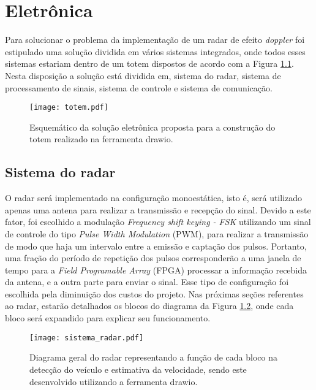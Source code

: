 
\chapter{Eletrônica}

Para solucionar o problema da implementação de um radar de efeito \emph{doppler}  foi estipulado uma solução dividida em vários sistemas integrados, onde todos esses sistemas estariam dentro de um totem dispostos de acordo com a Figura \ref{esquematico1}. Nesta disposição a solução está dividida em, sistema do radar,  sistema de processamento de sinais, sistema de controle e sistema de comunicação.
\begin{figure}[H]
    \centering
    \texttt{[image: totem.pdf]}
    \caption{Esquemático da solução eletrônica proposta para a construção do totem realizado na ferramenta drawio. }
    \label{esquematico1}
\end{figure}
\section{Sistema do radar}
O radar será implementado na configuração monoestática, isto é, será utilizado apenas uma  antena para realizar a transmissão e recepção do sinal. Devido a este fator, foi escolhido a modulação  \emph{ Frequency shift keying - FSK} utilizando um sinal de controle do tipo \emph{Pulse Width Modulation} (PWM), para realizar a transmissão de modo que haja um intervalo entre a emissão e captação dos pulsos. Portanto, uma fração do período de repetição dos pulsos corresponderão a uma janela de tempo para a \emph{Field Programable Array} (FPGA) processar a informação recebida da antena, e a outra parte para enviar o sinal. Esse tipo de configuração foi escolhida pela diminuição dos custos do projeto.
Nas próximas seções referentes ao radar, estarão detalhados os blocos do diagrama da Figura \ref{processos_geral_radar}, onde cada bloco será expandido para explicar seu funcionamento.
\begin{figure}[H]
    \centering
    \texttt{[image: sistema\_radar.pdf]}
    \caption{Diagrama geral do radar representando a função de cada bloco na detecção do veículo e estimativa da velocidade, sendo este desenvolvido utilizando a ferramenta drawio.}
    \label{processos_geral_radar}
\end{figure}

